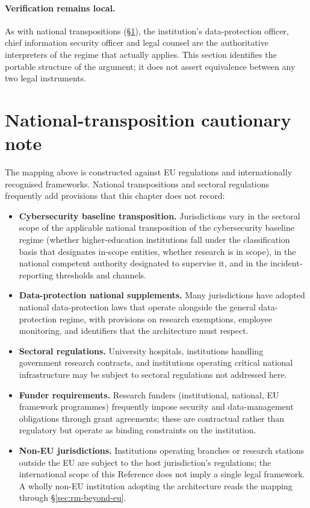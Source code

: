 \paragraph{Verification remains local.} As with national
transpositions (\S\ref{sec:rm-national}), the institution's
data-protection officer, chief information security officer and legal
counsel are the authoritative interpreters of the regime that actually
applies. This section identifies the portable structure of the
argument; it does not assert equivalence between any two legal
instruments.

\section{National-transposition cautionary note}
\label{sec:rm-national}

The mapping above is constructed against EU regulations and
internationally recognised frameworks. National transpositions
and sectoral regulations frequently add provisions that this
chapter does not record:

\begin{itemize}[leftmargin=1.5em,nosep]
  \item \textbf{Cybersecurity baseline transposition.}
    Jurisdictions vary in the sectoral scope of the applicable
    national transposition of the cybersecurity baseline regime
    (whether higher-education institutions fall under the
    classification basis that designates in-scope entities, whether
    research is in scope), in the national competent authority
    designated to supervise it, and in the incident-reporting
    thresholds and channels.
  \item \textbf{Data-protection national supplements.} Many
    jurisdictions have adopted national data-protection laws that
    operate alongside the general data-protection regime, with
    provisions on research exemptions, employee monitoring, and
    identifiers that the architecture must respect.
  \item \textbf{Sectoral regulations.} University hospitals,
    institutions handling government research contracts, and
    institutions operating critical national infrastructure may
    be subject to sectoral regulations not addressed here.
  \item \textbf{Funder requirements.} Research funders
    (institutional, national, EU framework programmes) frequently
    impose security and data-management obligations through grant
    agreements; these are contractual rather than regulatory but
    operate as binding constraints on the institution.
  \item \textbf{Non-EU jurisdictions.} Institutions operating
    branches or research stations outside the EU are subject to
    the host jurisdiction's regulations; the international scope
    of this Reference does not imply a single legal framework. A
    wholly non-EU institution adopting the architecture reads the
    mapping through \S\ref{sec:rm-beyond-eu}.
\end{itemize}

